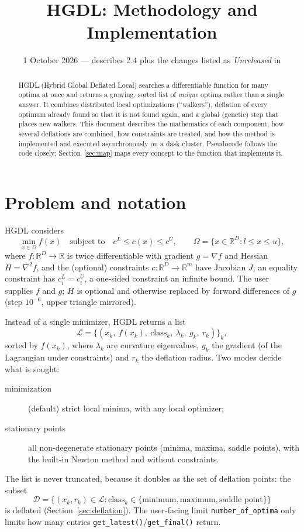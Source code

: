 \documentclass[11pt]{article}
\title{HGDL: Methodology and Implementation}
\date{1 October 2026 --- describes \code{hgdl} 2.4 plus the changes listed as \emph{Unreleased} in \code{CHANGELOG.md}}
\newcommand{\R}{\mathbb{R}}
\newcommand{\code}[1]{\texttt{#1}}
\begin{document}
\maketitle

\begin{abstract}
HGDL (Hybrid Global Deflated Local) searches a differentiable function for many optima at once
and returns a growing, sorted list of \emph{unique} optima rather than a single answer. It
combines distributed local optimizations (``walkers''), deflation of every optimum already
found so that it is not found again, and a global (genetic) step that places new walkers. This
document describes the mathematics of each component, how several deflations are combined,
how constraints are treated, and how the method is implemented and executed asynchronously on
a dask cluster. Pseudocode follows the code closely; Section~\ref{sec:map} maps every concept
to the function that implements it.
\end{abstract}

\tableofcontents

\section{Problem and notation}

HGDL considers
\begin{equation}\label{eq:problem}
  \min_{x \in \Omega} f(x) \quad\text{subject to}\quad c^L \le c(x) \le c^U,
  \qquad \Omega = \{x \in \R^D : l \le x \le u\},
\end{equation}
where $f:\R^D\to\R$ is twice differentiable with gradient $g = \nabla f$ and Hessian
$H = \nabla^2 f$, and the (optional) constraints $c:\R^D\to\R^m$ have Jacobian $J$; an equality
constraint has $c^L_i = c^U_i$, a one-sided constraint an infinite bound. The user supplies $f$
and $g$; $H$ is optional and otherwise replaced by forward differences of $g$
(step $10^{-6}$, upper triangle mirrored).

Instead of a single minimizer, HGDL returns a list
\[
  \mathcal{L} = \big\{(x_k,\ f(x_k),\ \text{class}_k,\ \lambda_k,\ g_k,\ r_k)\big\}_k ,
\]
sorted by $f(x_k)$, where $\lambda_k$ are curvature eigenvalues, $g_k$ the gradient (of the
Lagrangian under constraints) and $r_k$ the deflation radius. Two modes decide what is sought:
\begin{description}
  \item[minimization] (default) strict local minima, with any local optimizer;
  \item[stationary points] all non-degenerate stationary points (minima, maxima, saddle
  points), with the built-in Newton method and without constraints.
\end{description}
The list is never truncated, because it doubles as the set of deflation points: the subset
\[
  \mathcal{D} = \{(x_k, r_k) \in \mathcal{L} : \text{class}_k \in
  \{\text{minimum}, \text{maximum}, \text{saddle point}\}\}
\]
is deflated (Section~\ref{sec:deflation}). The user-facing limit \code{number\_of\_optima} only
limits how many entries \code{get\_latest()}/\code{get\_final()} return.
\end{document}
